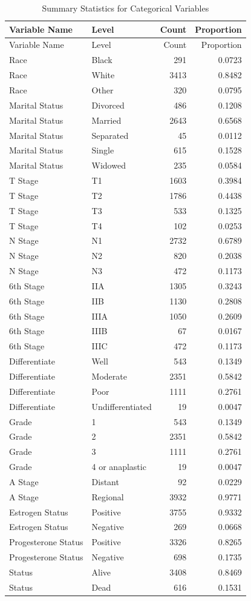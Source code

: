 \documentclass[
]{article}
\begin{document}
\begin{longtable}[]{@{}llrr@{}}
\caption{Summary Statistics for Categorical Variables}\tabularnewline
\toprule\noalign{}
Variable Name & Level & Count & Proportion \\
\midrule\noalign{}
\endfirsthead
\toprule\noalign{}
Variable Name & Level & Count & Proportion \\
\midrule\noalign{}
\endhead
\bottomrule\noalign{}
\endlastfoot
Race & Black & 291 & 0.0723 \\
Race & White & 3413 & 0.8482 \\
Race & Other & 320 & 0.0795 \\
Marital Status & Divorced & 486 & 0.1208 \\
Marital Status & Married & 2643 & 0.6568 \\
Marital Status & Separated & 45 & 0.0112 \\
Marital Status & Single & 615 & 0.1528 \\
Marital Status & Widowed & 235 & 0.0584 \\
T Stage & T1 & 1603 & 0.3984 \\
T Stage & T2 & 1786 & 0.4438 \\
T Stage & T3 & 533 & 0.1325 \\
T Stage & T4 & 102 & 0.0253 \\
N Stage & N1 & 2732 & 0.6789 \\
N Stage & N2 & 820 & 0.2038 \\
N Stage & N3 & 472 & 0.1173 \\
6th Stage & IIA & 1305 & 0.3243 \\
6th Stage & IIB & 1130 & 0.2808 \\
6th Stage & IIIA & 1050 & 0.2609 \\
6th Stage & IIIB & 67 & 0.0167 \\
6th Stage & IIIC & 472 & 0.1173 \\
Differentiate & Well & 543 & 0.1349 \\
Differentiate & Moderate & 2351 & 0.5842 \\
Differentiate & Poor & 1111 & 0.2761 \\
Differentiate & Undifferentiated & 19 & 0.0047 \\
Grade & 1 & 543 & 0.1349 \\
Grade & 2 & 2351 & 0.5842 \\
Grade & 3 & 1111 & 0.2761 \\
Grade & 4 or anaplastic & 19 & 0.0047 \\
A Stage & Distant & 92 & 0.0229 \\
A Stage & Regional & 3932 & 0.9771 \\
Estrogen Status & Positive & 3755 & 0.9332 \\
Estrogen Status & Negative & 269 & 0.0668 \\
Progesterone Status & Positive & 3326 & 0.8265 \\
Progesterone Status & Negative & 698 & 0.1735 \\
Status & Alive & 3408 & 0.8469 \\
Status & Dead & 616 & 0.1531 \\
\end{longtable}
\end{document}
